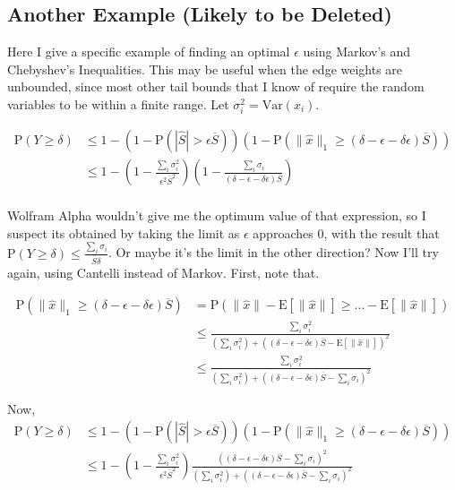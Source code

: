\documentclass{article}
\newcommand \E[1] {\mathrm E \left[#1\right]} %
\newcommand \Var[1] {\mathrm {Var} \left(#1\right)} %
\newcommand \p[1] {\mathrm P \left(#1\right)}
\begin{document}
\subsection{Another Example (Likely to be Deleted)}

Here I give a specific example of finding an optimal $\epsilon$ using Markov's and Chebyshev's Inequalities. This may be useful when the edge weights are unbounded, since most other tail bounds that I know of require the random variables to be within a finite range. Let $\sigma_i^2=\Var{x_i}$.

\begin{align*}
\p{Y\geq\delta} &\leq 1-\left(1-\p{|\hat S|>\epsilon\overline S}\right)\left(1-\p{\|\hat x\|_1\geq(\delta-\epsilon-\delta\epsilon)\overline S\right)} \\
&\leq 1 - \left(1-\frac{\sum_i \sigma_i^2}{\epsilon^2 \overline S^2}\right) \left(1-\frac{\sum_i \sigma_i}{(\delta-\epsilon-\delta\epsilon)\overline S} \right) \\
\end{align*}

Wolfram Alpha wouldn't give me the optimum value of that expression, so I suspect its obtained by taking the limit as $\epsilon$ approaches 0, with the result that $\p{Y\geq\delta} \leq \frac{\sum_i\sigma_i}{\overline S\delta}$. Or maybe it's the limit in the other direction? Now I'll try again, using Cantelli instead of Markov. First, note that.

\begin{align*}
\p{\|\hat x\|_1 \geq (\delta-\epsilon-\delta\epsilon)\overline S} &= \p{\|\hat x\|-\E{\|\hat x\|}\geq \ldots-\E{\|\hat x\|}} \\
&\leq \frac{\sum_i \sigma_i^2}{(\sum_i \sigma_i^2) + \left((\delta-\epsilon-\delta\epsilon)\overline S - \E{\|\hat x\|}\right)^2} \\
&\leq \frac{\sum_i \sigma_i^2}{(\sum_i \sigma_i^2) + \left((\delta-\epsilon-\delta\epsilon)\overline S - \sum_i \sigma_i \right)^2}
\end{align*}

Now,
\begin{align*}
\p{Y\geq\delta} &\leq 1-\left(1-\p{|\hat S|>\epsilon\overline S}\right)\left(1-\p{\|\hat x\|_1\geq(\delta-\epsilon-\delta\epsilon)\overline S\right)} \\
&\leq 1 - \left(1-\frac{\sum_i \sigma_i^2}{\epsilon^2 \overline S^2}\right) \frac{\left((\delta-\epsilon-\delta\epsilon)\overline S - \sum_i \sigma_i \right)^2}{(\sum_i \sigma_i^2) + \left((\delta-\epsilon-\delta\epsilon)\overline S - \sum_i \sigma_i \right)^2}
\end{align*}
\end{document}
